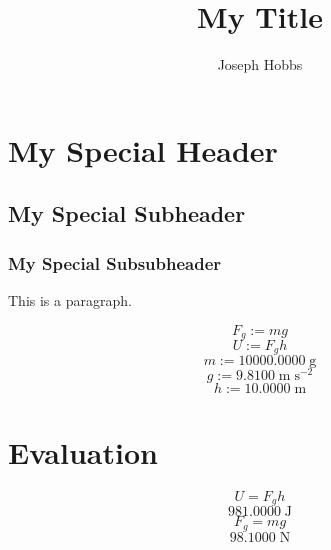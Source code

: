 \documentclass[12pt]{article}
\begin{document}
\title{\textbf{My Title}}
\author{Joseph Hobbs}
\maketitle
\tableofcontents


\section{My Special Header}




\subsection{My Special Subheader}




\subsubsection{My Special Subsubheader}




This is a paragraph.\par


$$
F_{g} := m g
$$
$$
U := F_{g} h
$$
$$
m := 10000.0000 \; \mathrm{g}
$$
$$
g := 9.8100 \; \mathrm{m} \; \mathrm{s^{-2}}
$$
$$
h := 10.0000 \; \mathrm{m}
$$


\section{Evaluation}


$$
U = F_{g} h
$$
$$
981.0000 \; \mathrm{J}
$$
$$
F_{g} = m g
$$
$$
98.1000 \; \mathrm{N}
$$
\end{document}
